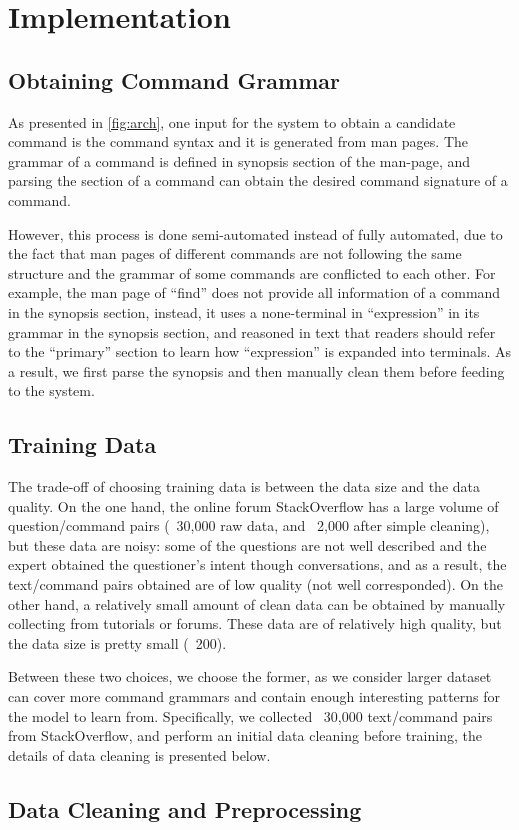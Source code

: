 \section{Implementation}

\subsection{Obtaining Command Grammar}
As presented in \autoref{fig:arch}, one input for the system to obtain a candidate command is the command syntax and it is generated from man pages. The grammar of a command is defined in synopsis section of the man-page, and parsing the section of a command can obtain the desired command signature of a command. 

However, this process is done semi-automated instead of fully automated, due to the fact that man pages of different commands are not following the same structure and the grammar of some commands are conflicted to each other. For example, the man page of ``find'' does not provide all information of a command in the synopsis section, instead, it uses a none-terminal in ``expression'' in its grammar in the synopsis section, and reasoned in text that readers should refer to the ``primary'' section to learn how ``expression'' is expanded into terminals. As a result, we first parse the synopsis and then manually clean them before feeding to the system.

\subsection{Training Data}

The trade-off of choosing training data is between the data size and the data quality. On the one hand, the online forum StackOverflow has a large volume of question/command pairs (~30,000 raw data, and ~2,000 after simple cleaning), but these data are noisy: some of the questions are not well described and the expert obtained the questioner's intent though conversations, and as a result, the text/command pairs obtained are of low quality (not well corresponded). On the other hand, a relatively small amount of clean data can be obtained by manually collecting from tutorials or forums. These data are of relatively high quality, but the data size is pretty small (~200).

Between these two choices, we choose the former, as we consider larger dataset can cover more command grammars and contain enough interesting patterns for the model to learn from. Specifically, we collected ~30,000 text/command pairs from StackOverflow, and perform an initial data cleaning before training, the details of data cleaning is presented below.

\subsection{Data Cleaning and Preprocessing}